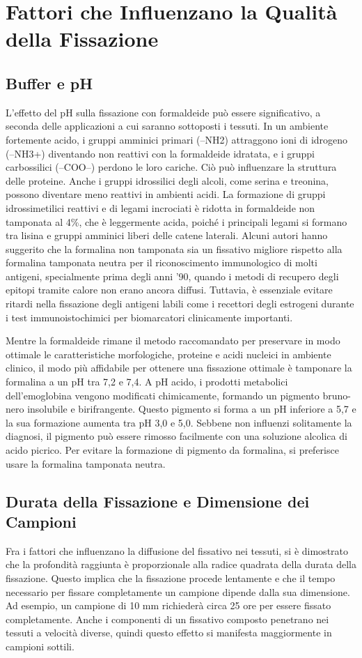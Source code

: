 \section{Fattori che Influenzano la Qualità della Fissazione}
\subsection{Buffer e pH}
L'effetto del pH sulla fissazione con formaldeide può essere significativo, a seconda delle applicazioni a cui saranno sottoposti i tessuti. In un ambiente fortemente acido, i gruppi amminici primari (–NH2) attraggono ioni di idrogeno (–NH3+) diventando non reattivi con la formaldeide idratata, e i gruppi carbossilici (–COO--) perdono le loro cariche. Ciò può influenzare la struttura delle proteine. Anche i gruppi idrossilici degli alcoli, come serina e treonina, possono diventare meno reattivi in ambienti acidi. La formazione di gruppi idrossimetilici reattivi e di legami incrociati è ridotta in formaldeide non tamponata al 4\%, che è leggermente acida, poiché i principali legami si formano tra lisina e gruppi amminici liberi delle catene laterali. Alcuni autori hanno suggerito che la formalina non tamponata sia un fissativo migliore rispetto alla formalina tamponata neutra per il riconoscimento immunologico di molti antigeni, specialmente prima degli anni '90, quando i metodi di recupero degli epitopi tramite calore non erano ancora diffusi. Tuttavia, è essenziale evitare ritardi nella fissazione degli antigeni labili come i recettori degli estrogeni durante i test immunoistochimici per biomarcatori clinicamente importanti.

Mentre la formaldeide rimane il metodo raccomandato per preservare in modo ottimale le caratteristiche morfologiche, proteine e acidi nucleici in ambiente clinico, il modo più affidabile per ottenere una fissazione ottimale è tamponare la formalina a un pH tra 7,2 e 7,4. A pH acido, i prodotti metabolici dell'emoglobina vengono modificati chimicamente, formando un pigmento bruno-nero insolubile e birifrangente. Questo pigmento si forma a un pH inferiore a 5,7 e la sua formazione aumenta tra pH 3,0 e 5,0. Sebbene non influenzi solitamente la diagnosi, il pigmento può essere rimosso facilmente con una soluzione alcolica di acido picrico. Per evitare la formazione di pigmento da formalina, si preferisce usare la formalina tamponata neutra.

\subsection{Durata della Fissazione e Dimensione dei Campioni}
Fra i fattori che influenzano la diffusione del fissativo nei tessuti, si è dimostrato che la profondità raggiunta è proporzionale alla radice quadrata della durata della fissazione. Questo implica che la fissazione procede lentamente e che il tempo necessario per fissare completamente un campione dipende dalla sua dimensione. Ad esempio, un campione di 10 mm richiederà circa 25 ore per essere fissato completamente. Anche i componenti di un fissativo composto penetrano nei tessuti a velocità diverse, quindi questo effetto si manifesta maggiormente in campioni sottili.

